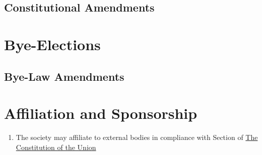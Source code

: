 \documentclass{scrartcl}
\begin{document}
        \subsection{Constitutional Amendments}
            \label{agm--consitutional-amendment}

    \clearpage
    \section{Bye-Elections}
        \label{bye-election}
        \subsection{Bye-Law Amendments}
            \label{bye-election--bye-law-amendment}

    \section{Affiliation and Sponsorship}
        \label{affiliation}
        \begin{enumerate}
            \item The society may affiliate to external bodies in compliance with Section of \href{https://gap.lancs.ac.uk}{The Constitution of the Union}
        \end{enumerate}
\end{document}
